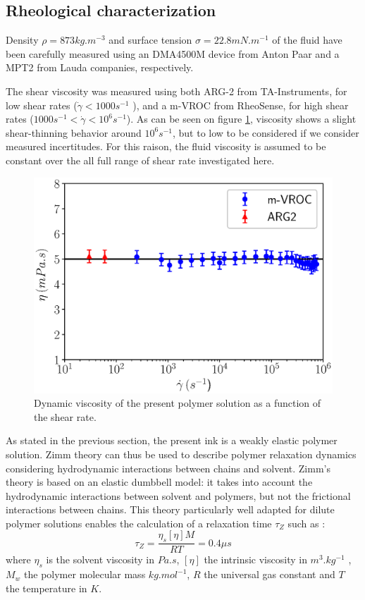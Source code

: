 \documentclass[onecolumn, 12pt]{asme2ej}
\begin{document}
\subsection{Rheological characterization}\label{sec:rheo}

Density $\rho = 873 kg.m^{-3}$ and surface tension $\sigma = 22.8 mN.m^{-1}$ of the fluid have been carefully measured using an DMA4500M
device from Anton Paar and a MPT2 from Lauda companies, respectively. 

The shear viscosity was measured using both ARG-2 from TA-Instruments, for low shear rates ($\dot{\gamma} < 1000 s^{-1}$ ), and a m-VROC from RheoSense, for high shear rates ($1000 s^{-1}<\dot{\gamma} < 10^6 s^{-1}$). As can be seen on figure \ref{beahaviorLaw}, viscosity shows a slight shear-thinning behavior around $10^6s^{-1}$, but to low to be considered if we consider measured incertitudes. For this raison, the fluid viscosity is assumed to be constant over the all full range of shear rate investigated here.

\begin{figure}[H]
    \centering
    \includegraphics[width=15cm]{Figures/Fig4.eps}
    \caption{Dynamic viscosity of the present polymer solution as a function of the shear rate.}
    \label{beahaviorLaw}
\end{figure}

As stated in the previous section, the present ink is a weakly elastic polymer solution. Zimm theory \cite{zimm1956dynamics} can thus be used to describe polymer relaxation dynamics considering hydrodynamic interactions between chains and solvent. Zimm's theory is based on an elastic dumbbell model: it takes into account the hydrodynamic interactions between solvent and polymers, but not the frictional interactions between chains.
This theory particularly well adapted for dilute polymer solutions enables the calculation of a relaxation time $\tau_Z$ such as :
\begin{equation}
    \tau_Z = \frac{\eta_s [\eta] M}{RT} = 0.4 \mu s
    \label{zimm} 
\end{equation}
where $\eta_s$ is the solvent viscosity in $Pa.s$, $[\eta]$ the intrinsic viscosity in $m^3.kg^{-1}$ , $M_w$ the polymer molecular mass $kg.mol^{-1}$, $R$ the universal gas constant and $T$ the temperature in $K$.
\end{document}
